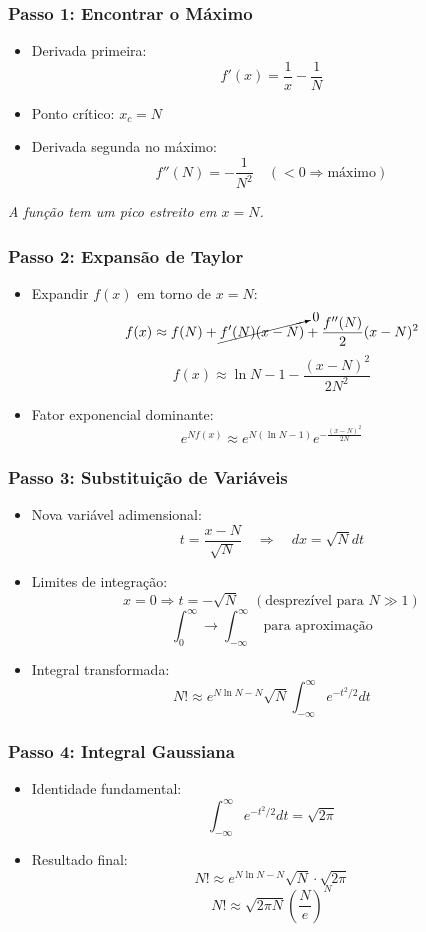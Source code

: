 \documentclass[11pt]{beamer}
\begin{document}
\begin{frame}
\frametitle{Passo 1: Encontrar o Máximo}
\begin{itemize}
\item Derivada primeira:
\[ f'(x) = \frac{1}{x} - \frac{1}{N} \]
\item Ponto crítico: \( x_c = N \)
\item Derivada segunda no máximo:
\[ f''(N) = -\frac{1}{N^2} \quad (< 0 \Rightarrow \text{máximo}) \]
\end{itemize}
\begin{center}
    \textit{A função tem um pico estreito em \( x = N \).}
\end{center}
\end{frame}

\begin{frame}
\frametitle{Passo 2: Expansão de Taylor}
\begin{itemize}
\item Expandir \( f(x) \) em torno de \( x = N \):
\[
f(x) \approx f(N) + \cancelto{0}{f'(N)(x-N)} + \frac{f''(N)}{2}(x-N)^2
\]
\[
f(x) \approx \ln N - 1 - \frac{(x-N)^2}{2N^2}
\]
\item Fator exponencial dominante:
\[
e^{N f(x)} \approx e^{N (\ln N - 1)} e^{-\frac{(x-N)^2}{2N}}
\]
\end{itemize}
\end{frame}

\begin{frame}
\frametitle{Passo 3: Substituição de Variáveis}
\begin{itemize}
\item Nova variável adimensional:
\[ t = \frac{x - N}{\sqrt{N}} \quad \Rightarrow \quad dx = \sqrt{N} dt \]
\item Limites de integração:
\[ x = 0 \Rightarrow t = -\sqrt{N} \quad (\text{desprezível para } N \gg 1) \]
\[ \int_0^\infty \to \int_{-\infty}^\infty \text{ para aproximação} \]
\item Integral transformada:
\[
N! \approx e^{N \ln N - N} \sqrt{N} \int_{-\infty}^\infty e^{-t^2/2} dt
\]
\end{itemize}
\end{frame}

\begin{frame}
\frametitle{Passo 4: Integral Gaussiana}
\begin{itemize}
\item Identidade fundamental:
\[ \int_{-\infty}^\infty e^{-t^2/2} dt = \sqrt{2\pi} \]
\item Resultado final:
\[
N! \approx e^{N \ln N - N} \sqrt{N} \cdot \sqrt{2\pi}
\]
\[
N! \approx \sqrt{2\pi N} \left( \frac{N}{e} \right)^N
\]
\end{itemize}
\end{frame}
\end{document}
